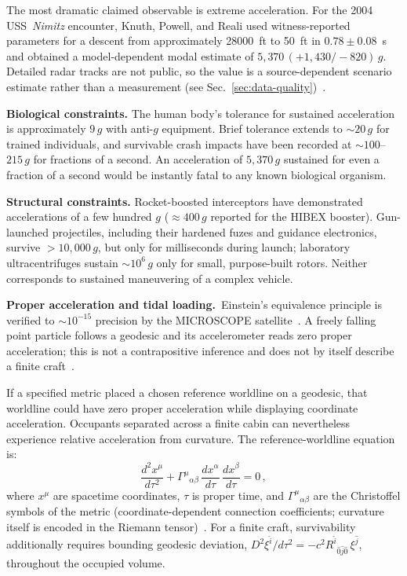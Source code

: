 \documentclass[aps,prd,twocolumn,superscriptaddress,nofootinbib,floatfix]{revtex4-2}
\begin{document}
The most dramatic claimed observable is extreme acceleration. For the 2004
USS~\textit{Nimitz} encounter, Knuth, Powell, and Reali used witness-reported
parameters for a descent from approximately \SI{28000}{ft} to \SI{50}{ft} in
$0.78\pm0.08$~s and obtained a model-dependent modal estimate of
$5{,}370\,(+1{,}430/{-}820)\,g$. Detailed radar tracks are not public, so the
value is a source-dependent scenario estimate rather than a measurement (see
Sec.~\ref{sec:data-quality})~\cite{Knuth2019}.

\textbf{Biological constraints.} The human body's tolerance for sustained
acceleration is approximately $9\,g$ with anti-$g$ equipment. Brief tolerance
extends to ${\sim}20\,g$ for trained individuals, and survivable crash impacts
have been recorded at ${\sim}100$--$215\,g$ for fractions of a second. An
acceleration of $5{,}370\,g$ sustained for even a fraction of a second would be
instantly fatal to any known biological organism.

\textbf{Structural constraints.} Rocket-boosted interceptors have demonstrated
accelerations of a few hundred $g$ (${\approx}400\,g$ reported for the HIBEX
booster). Gun-launched projectiles, including their hardened fuzes and guidance
electronics, survive $>10{,}000\,g$, but only for milliseconds during launch;
laboratory ultracentrifuges sustain ${\sim}10^{6}\,g$ only for small,
purpose-built rotors. Neither corresponds to sustained maneuvering of a complex
vehicle.

\textbf{Proper acceleration and tidal loading.}\ Einstein's equivalence
principle is verified to ${\sim}10^{-15}$ precision by the MICROSCOPE
satellite~\cite{Touboul2022}. A freely falling point particle follows a geodesic
and its accelerometer reads zero proper acceleration; this is not a contrapositive
inference and does not by itself describe a finite craft~\cite{MTW1973,Wald1984}.

If a specified metric placed a chosen reference worldline on a geodesic, that
worldline could have zero proper acceleration while displaying coordinate
acceleration. Occupants separated across a finite cabin can nevertheless
experience relative acceleration from curvature. The reference-worldline equation
is:
\begin{equation}\label{eq:geodesic}
  \frac{d^{2}x^{\mu}}{d\tau^{2}}
  + \Gamma^{\mu}{}_{\alpha\beta}\,
    \frac{dx^{\alpha}}{d\tau}\,\frac{dx^{\beta}}{d\tau} = 0\,,
\end{equation}
where $x^{\mu}$ are spacetime coordinates, $\tau$ is proper time, and
$\Gamma^{\mu}{}_{\alpha\beta}$ are the Christoffel symbols of the metric
(coordinate-dependent connection coefficients; curvature itself is encoded in the
Riemann tensor)~\cite{MTW1973,Wald1984}. For a finite craft, survivability
additionally requires bounding geodesic deviation,
$D^{2}\xi^{\hat{i}}/d\tau^{2}=-c^{2}R^{\hat{i}}{}_{\hat{0}\hat{j}\hat{0}}\,\xi^{\hat{j}}$,
throughout the occupied volume.
\end{document}
